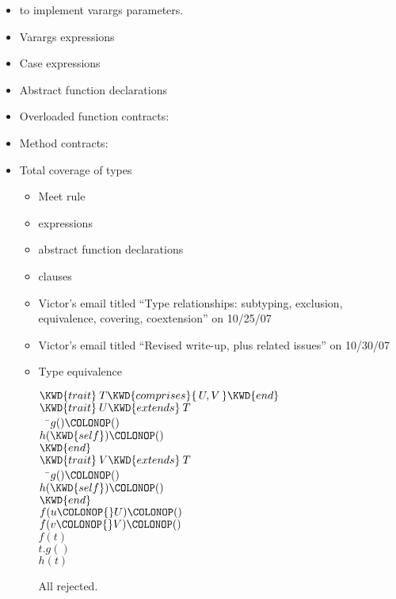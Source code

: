 \begin{itemize}
\item {} to implement varargs parameters.

\item Varargs expressions%

\item Case expressions%

 \item Abstract function declarations

\item Overloaded function contracts: 

\item Method contracts: 

\item Total coverage of types
 \begin{itemize}
 \item Meet rule
 \item {} expressions
 \item abstract function declarations
 \item {} clauses
 \item Victor's email titled ``Type relationships: subtyping, exclusion, equivalence, covering, coextension'' on 10/25/07
 \item Victor's email titled ``Revised write-up, plus related issues'' on 10/30/07
 \item Type equivalence

\begin{Fortress}
\(\KWD{trait}\:T \KWD{comprises}\{\,U, V\,\} \KWD{end}\)\\
\(\KWD{trait}\:U \KWD{extends}\:T\)\\
{\tt~~}\pushtabs\=\+\(  g()\COLONOP()\)\\
\(  h(\KWD{self})\COLONOP()\)\-\\\poptabs
\(\KWD{end}\)\\
\(\KWD{trait}\:V \KWD{extends}\:T\)\\
{\tt~~}\pushtabs\=\+\(  g()\COLONOP()\)\\
\(  h(\KWD{self})\COLONOP()\)\-\\\poptabs
\(\KWD{end}\)\\
\(f(u\COLONOP{}U)\COLONOP()\)\\
\(f(v\COLONOP{}V)\COLONOP()\)\\[4pt]
\(f(t)\)\\
\(t.g()\)\\
\(h(t)\)
\end{Fortress}
All rejected.
 \end{itemize}


\end{itemize}

